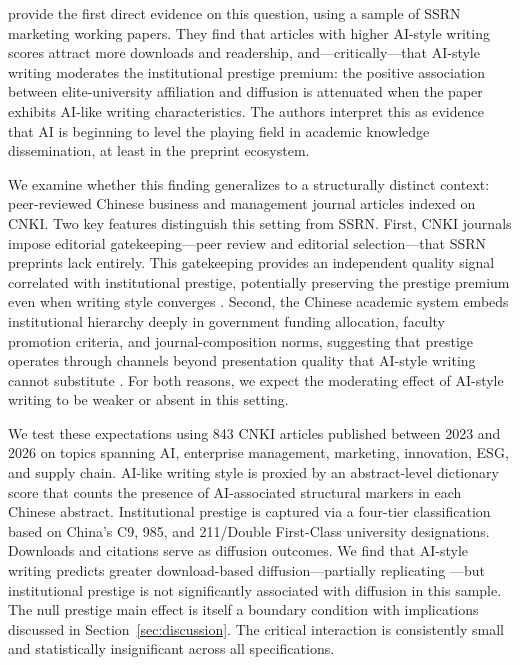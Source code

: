 \documentclass[12pt,a4paper]{article}
\begin{document}
\citet{JoLi2026} provide the first direct evidence on this question,
using a sample of SSRN marketing working papers.
They find that articles with higher AI-style writing scores attract
more downloads and readership, and---critically---that AI-style writing
moderates the institutional prestige premium: the positive association
between elite-university affiliation and diffusion is attenuated when
the paper exhibits AI-like writing characteristics.
The authors interpret this as evidence that AI is beginning to level
the playing field in academic knowledge dissemination, at least in the
preprint ecosystem.

We examine whether this finding generalizes to a structurally distinct
context: peer-reviewed Chinese business and management journal articles
indexed on CNKI.
Two key features distinguish this setting from SSRN.
First, CNKI journals impose editorial gatekeeping---peer review and
editorial selection---that SSRN preprints lack entirely.
This gatekeeping provides an independent quality signal correlated with
institutional prestige, potentially preserving the prestige premium
even when writing style converges \citep{Bornmann2008}.
Second, the Chinese academic system embeds institutional hierarchy
deeply in government funding allocation, faculty promotion criteria,
and journal-composition norms, suggesting that prestige operates
through channels beyond presentation quality that AI-style writing
cannot substitute \citep{DiMaggio1983,Long1979}.
For both reasons, we expect the moderating effect of AI-style writing
to be weaker or absent in this setting.

We test these expectations using 843 CNKI articles published between
2023 and 2026 on topics spanning AI, enterprise management, marketing,
innovation, ESG, and supply chain.
AI-like writing style is proxied by an abstract-level dictionary score
that counts the presence of AI-associated structural markers in each
Chinese abstract.
Institutional prestige is captured via a four-tier classification
based on China's C9, 985, and 211/Double First-Class university
designations.
Downloads and citations serve as diffusion outcomes.
We find that AI-style writing predicts greater download-based
diffusion---partially replicating \citet{JoLi2026}---but institutional
prestige is not significantly associated with diffusion in this sample.
The null prestige main effect is itself a boundary condition with
implications discussed in Section~\ref{sec:discussion}.
The critical interaction is consistently small and statistically
insignificant across all specifications.
\end{document}
